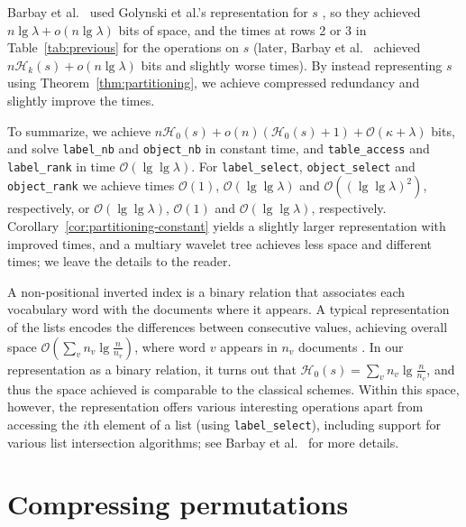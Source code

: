 \documentclass[11pt]{article}
\newcommand{\Oh}[1]
    {\ensuremath{\mathcal{O}\left( {#1} \right)}}
\newcommand{\HH}{\mathcal{H}}
\newcommand{\Ho}{\HH_0}
\newcommand{\Hk}{\HH_k}
\begin{document}
Barbay et al.~\cite{BGMR07} used Golynski et al.'s representation for $s$
\cite{GMR06}, so they achieved $n\lg\lambda + o(n\lg\lambda)$ bits of space,
and the times at rows 2 or 3 in Table~\ref{tab:previous} for the
operations on $s$ (later, Barbay et al.~\cite{BHMR07} achieved $n\Hk(s) +
o(n\lg\lambda)$ bits and slightly worse times).
By instead representing $s$ using Theorem~\ref{thm:partitioning},
we achieve compressed redundancy and slightly improve the times. 

To summarize, we achieve $n\Ho(s) + o(n)(\Ho(s)+1) + 
\Oh{\kappa + \lambda}$ bits, and solve 
{\tt label\_nb} and {\tt object\_nb} in constant
time, and {\tt table\_access} and {\tt label\_rank} in time $\Oh{\lg\lg\lambda}$.
For {\tt label\_select}, {\tt object\_select} and {\tt object\_rank} we
achieve times $\Oh{1}$, $\Oh{\lg\lg\lambda}$ and $\Oh{(\lg\lg\lambda)^2}$, 
respectively, or $\Oh{\lg\lg\lambda}$, $\Oh{1}$ and $\Oh{\lg\lg\lambda}$, 
respectively. Corollary~\ref{cor:partitioning-constant} yields a slightly
larger representation with improved times, and a multiary wavelet tree
\cite[Thm.~4]{GRR08} achieves less space and different times; we leave the 
details to the reader.

A non-positional inverted index is a binary relation that associates each
vocabulary word with the documents where it appears. A typical representation
of the lists encodes the differences between consecutive values, achieving
overall space $\Oh{\sum_v n_v \lg\frac{n}{n_v}}$, where word $v$ appears in
$n_v$ documents \cite{WMB99}. In our representation as a binary relation,
it turns out that $\Ho(s) = \sum_v n_v \lg\frac{n}{n_v}$, and thus the
space achieved is comparable to the classical schemes. Within this space,
however, the representation offers various interesting operations apart
from accessing the $i$th element of a list (using {\tt label\_select}),
including support for various list intersection algorithms;
see Barbay et al.~\cite{BGMR07,BHMR07} for more details.

\section{Compressing permutations} \label{sec:permutations}
\end{document}
